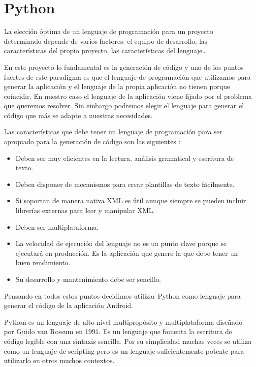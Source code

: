 \section{Python}\label{sec:tecnologias:python}
La elección óptima de un lenguaje de programación para un proyecto determinado depende de varios factores: el equipo de desarrollo, las características del propio proyecto, las características del lenguaje\ldots\par
En este proyecto lo fundamental es la generación de código y uno de los puntos fuertes de este paradigma es que el lenguaje de programación que utilizamos para generar la aplicación y el lenguaje de la propia aplicación no tienen porque coincidir. En nuestro caso el lenguaje de la aplicación viene fijado por el problema que queremos resolver. Sin embargo podremos elegir el lenguaje para generar el código que más se adapte a nuestras necesidades.\par
Las características que debe tener un lenguaje de programación para ser apropiado para la generación de código son las siguientes \cite{herrington2003code}:
\begin{itemize}
\item Deben ser muy eficientes en la lectura, análisis gramatical y escritura de texto.
\item Deben disponer de mecanismos para crear plantillas de texto fácilmente.
\item Si soportan de manera nativa XML es útil aunque siempre se pueden incluir librerías externas para leer y manipular XML.
\item Deben ser multiplataforma.
\item La velocidad de ejecución del lenguaje no es un punto clave porque se ejecutará en producción. Es la aplicación que genere la que debe tener un buen rendimiento.
\item Su desarrollo y mantenimiento debe ser sencillo. 
\end{itemize}
\medskip\par
Pensando en todos estos puntos decidimos utilizar Python como lenguaje para generar el código de la aplicación Android.\par
Python es un lenguaje de alto nivel multipropósito y multiplataforma diseñado por Guido van Rossum en 1991. Es un lenguaje que fomenta la escritura de código legible con una sintaxis sencilla. Por su simplicidad muchas veces se utiliza como un lenguaje de scripting pero es un lenguaje suficientemente potente para utilizarlo en otros muchos contextos.\par
